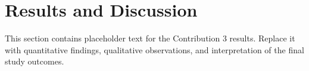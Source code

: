 \section{Results and Discussion}
\label{sec::contrib3::results}

This section contains placeholder text for the Contribution 3 results. Replace it with quantitative findings, qualitative observations, and interpretation of the final study outcomes.
